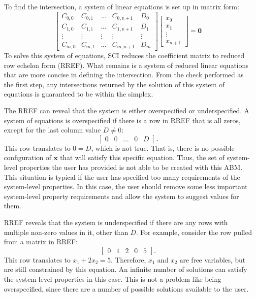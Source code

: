 To find the intersection, a system of linear equations is set up in matrix form:
\[  \left[ \begin{array}{ccccc}
C_{0,0} & C_{0, 1} & ... & C_{0,n+1} & D_0 \\
C_{1,0} & C_{1, 1} & ... & C_{1,n+1} & D_1 \\
\vdots  & \vdots   & \vdots & \vdots & \vdots \\
C_{m,0} & C_{m, 1} & ... & C_{m, n+1} & D_m \end{array} \right]
\left[ \begin{array}{c}
x_0 \\
x_1 \\
\vdots \\
x_{n+1} \end{array} \right] = \mathbf 0
\] 
To solve this system of equations, SCI reduces the coefficient matrix to reduced row echelon form (RREF).
What remains is a system of reduced linear equations that are more concise in defining the intersection.
From the check performed as the first step, any intersections returned by the solution of this system of equations is guaranteed to be within the simplex.


The RREF can reveal that the system is either overspecified or underspecified.
A system of equations is overspecified if there is a row in RREF that is all zeros, except for the last column value $D \neq 0$:
\[ \left[ \begin{array}{ccccc} 0 & 0 & ... & 0 & D \end{array} \right]. \]
This row translates to $0 = D$, which is not true.
That is, there is no possible configuration of $\mathbf x$ that will satisfy this specific equation.
Thus, the set of system-level properties the user has provided is not able to be created with this ABM.
This situation is typical if the user has specified too many requirements of the system-level properties.
In this case, the user should remove some less important system-level property requirements and allow the system to suggest values for them.

RREF reveals that the system is underspecified if there are any rows with multiple non-zero values in it, other than $D$. For example, consider the row pulled from a matrix in RREF:
\[ \left[ \begin{array}{ccccc} 0 & 1 & 2 & 0 & 5 \end{array} \right]. \]
This row translates to $x_1 + 2x_2 = 5$.
Therefore, $x_1$ and $x_2$ are free variables, but are still constrained by this equation.
An infinite number of solutions can satisfy the system-level properties in this case.
This is not a problem like being overspecified, since there are a number of possible solutions available to the user.


